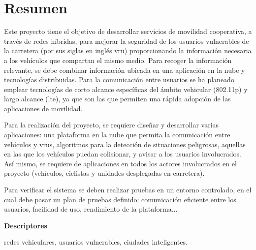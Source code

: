 \chapter*{Resumen}
Este proyecto tiene el objetivo de desarrollar servicios de movilidad
cooperativa, a través de redes híbridas, para mejorar la seguridad de los
usuarios vulnerables de la carretera (por sus siglas en inglés \gls{vru})
proporcionando la información necesaria a los vehículos que compartan el mismo
medio. Para recoger la información relevante, se debe combinar información
ubicada en una aplicación en la nube y tecnologías distribuidas. Para la
comunicación entre usuarios se ha planeado emplear tecnologías de corto alcance
específicas del ámbito vehicular (\Gls{802.11p}) y largo alcance (\gls{lte}),
ya que son las que permiten una rápida adopción de las aplicaciones de
movilidad.

Para la realización del proyecto, se requiere diseñar y desarrollar varias
aplicaciones: una plataforma en la nube que permita la comunicación entre
vehículos y \gls{vru}s, algoritmos para la detección de situaciones peligrosas,
aquellas en las que los vehículos puedan colisionar, y avisar a los usuarios
involucrados. Así mismo, se requiere de aplicaciones en todos los actores
involucrados en el proyecto (vehículos, ciclistas y unidades desplegadas en
carretera).

Para verificar el sistema se deben realizar pruebas en un entorno controlado,
en el cual debe pasar un plan de pruebas definido: comunicación eficiente entre
los usuarios, facilidad de uso, rendimiento de la plataforma...

\vspace{2em}

{\Large\bfseries\sectionfont Descriptores}
\vspace{3\medskipamount}

redes vehiculares, usuarios vulnerables, ciudades inteligentes.

\cleardoublepage\tableofcontents
\cleardoublepage\listoffigures
\cleardoublepage\listoftables
\cleardoublepage\listoflistings

\mainmatter
\pagestyle{phdthesis}
